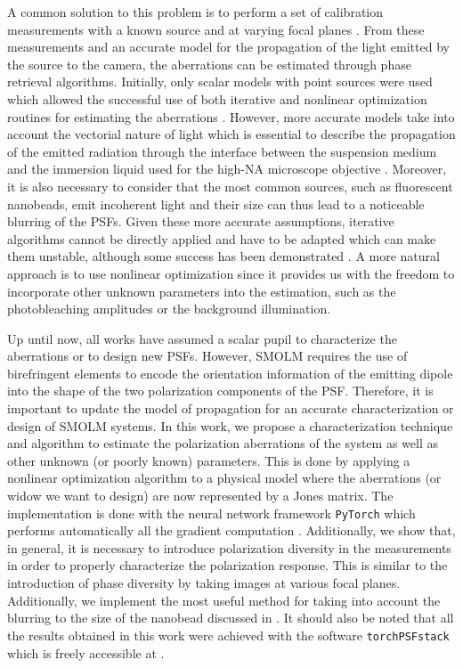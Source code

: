 \documentclass[reprint,aps,pra,superscriptaddress,
amsmath,amssymb]{revtex4-1}
\begin{document}
A common solution to this problem is to perform a set of calibration 
measurements with a known source and at varying focal planes 
\cite{hanser2003phase,hanser2004phase}. From 
these measurements and an accurate model for the propagation of the light
emitted by the source to the camera, the aberrations can be estimated 
through phase retrieval algorithms. Initially, only scalar models with point 
sources were used which allowed the successful use of both iterative and 
nonlinear optimization routines for estimating the aberrations 
\cite{hanser2003phase,hanser2004phase,clark2012microscope}. However, 
more accurate models \cite{thao2019phase,ferdman2020vipr} take into 
account the vectorial nature of light which is essential to describe 
the propagation of the emitted radiation through the 
interface between the suspension medium and the immersion liquid used for 
the high-NA microscope objective \cite{novotny2006principles}. Moreover,
it is also necessary to consider that the most common sources, 
such as fluorescent nanobeads, emit 
incoherent light and their size can thus lead to a noticeable blurring of 
the PSFs.
Given these more accurate assumptions, 
iterative algorithms cannot be directly applied and have to be adapted which 
can make them unstable, although some success has been demonstrated 
\cite{thao2019phase}. A more natural approach is to use nonlinear optimization
\cite{fienup1982phase,ferdman2020vipr}
since it provides us with the freedom to incorporate other unknown parameters
into the estimation, such as the photobleaching amplitudes or the background 
illumination.

Up until now, all works have assumed a scalar pupil to characterize 
the aberrations or to design new PSFs. However, SMOLM requires the use 
of birefringent elements to encode the orientation information of the 
emitting dipole
into the shape of the two polarization components of the PSF. 
Therefore, it is important to update the model of propagation for an accurate
characterization or design of SMOLM systems. In this work, we propose a 
characterization technique and algorithm to estimate the polarization aberrations 
of the system \cite{hansen1988overcoming} as well as other unknown (or poorly known) parameters. 
This is done by applying a nonlinear optimization algorithm to a physical model
where the aberrations (or widow we want to design) are now represented by a Jones
matrix. The implementation is done with the 
neural network framework \texttt{PyTorch} \cite{} which performs automatically
all the gradient computation \cite{}. Additionally, we show that, in general,
it is necessary to introduce polarization diversity in the measurements 
in order to properly characterize the polarization response. This is similar 
to the introduction of phase diversity by taking images at various focal planes.
Additionally, we implement the most useful method for taking into account the 
blurring to the size of the nanobead discussed in \cite{}.
It should also be noted that all the results obtained in this work 
were achieved with the software \texttt{torchPSFstack} which is freely 
accessible at \cite{}.
\end{document}
